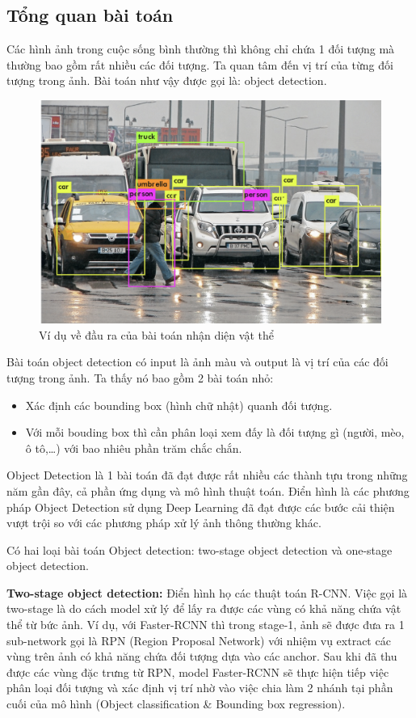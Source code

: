 \documentclass[a4paper, 12pt]{report}
\begin{document}
\subsection{Tổng quan bài toán}
Các hình ảnh trong cuộc sống bình thường thì không chỉ chứa 1 đối tượng mà thường bao gồm rất nhiều các đối tượng. Ta quan tâm đến vị trí của từng đối tượng trong ảnh. Bài toán như vậy được gọi là: object detection.\par
\begin{figure}[!h]
	\centering
	\includegraphics[width=0.7\linewidth]{Images/object_in_real}
	\caption{Ví dụ về đầu ra của bài toán nhận diện vật thể}
	\label{fig:det}
\end{figure}
Bài toán object detection có input là ảnh màu và output là vị trí của các đối tượng trong ảnh. Ta thấy nó bao gồm 2 bài toán nhỏ:
\begin{itemize}
	\item Xác định các bounding box (hình chữ nhật) quanh đối tượng.
	\item Với mỗi bouding box thì cần phân loại xem đấy là đối tượng gì (người, mèo, ô tô,…) với bao nhiêu phần trăm chắc chắn.
\end{itemize}
Object Detection là 1 bài toán đã đạt được rất nhiều các thành tựu trong những năm gần đây, cả phần ứng dụng và mô hình thuật toán. Điển hình là các phương pháp Object Detection sử dụng Deep Learning đã đạt được các bước cải thiện vượt trội so với các phương pháp xử lý ảnh thông thường khác.\par
Có hai loại bài toán Object detection: two-stage object detection và one-stage object detection.\par
\textbf{Two-stage object detection:} Điển hình họ các thuật toán R-CNN. Việc gọi là two-stage là do cách model xử lý để lấy ra được các vùng có khả năng chứa vật thể từ bức ảnh. Ví dụ, với Faster-RCNN thì trong stage-1, ảnh sẽ được đưa ra 1 sub-network gọi là RPN (Region Proposal Network) với nhiệm vụ extract các vùng trên ảnh có khả năng chứa đối tượng dựa vào các anchor. Sau khi đã thu được các vùng đặc trưng từ RPN, model Faster-RCNN sẽ thực hiện tiếp việc phân loại đối tượng và xác định vị trí nhờ vào việc chia làm 2 nhánh tại phần cuối của mô hình (Object classification \& Bounding box regression).\par
\end{document}

